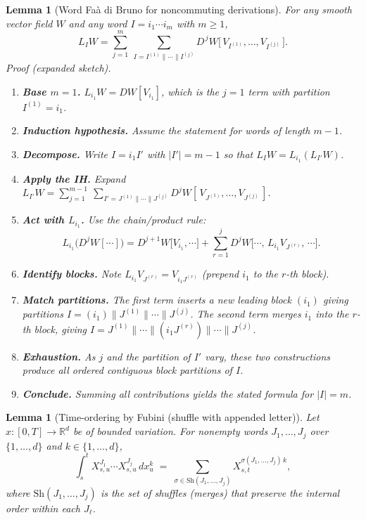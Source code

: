 \documentclass[12pt]{article}
\newtheorem{lemma}[theorem]{Lemma}
\theoremstyle{remark}
\begin{document}
\begin{lemma}[Word Fa\`a di Bruno for noncommuting derivations]\label{lem:word-FDB}
For any smooth vector field $W$ and any word $I=i_1\cdots i_m$ with $m\ge1$,
\[
\boxed{\;
L_I W
=\sum_{j=1}^{m}\ \sum_{I=I^{(1)}\|\cdots\| I^{(j)}}
D^{\,j}W\big[\,V_{I^{(1)}},\dots,V_{I^{(j)}}\,\big].
\;}
\]
\emph{Proof (expanded sketch).}
\begin{enumerate}[leftmargin=*, itemsep=0.25em]
\item \textbf{Base $m=1$.} $L_{i_1}W=DW[V_{i_1}]$, which is the $j=1$ term with partition $I^{(1)}=i_1$.
\item \textbf{Induction hypothesis.} Assume the statement for words of length $m-1$.
\item \textbf{Decompose.} Write $I=i_1 I'$ with $|I'|=m-1$ so that $L_I W=L_{i_1}(L_{I'}W)$.
\item \textbf{Apply the IH.} Expand $L_{I'}W=\sum_{j=1}^{m-1}\ \sum_{I'=J^{(1)}\|\cdots\|J^{(j)}} D^{j}W[\,V_{J^{(1)}},\dots,V_{J^{(j)}}\,]$.
\item \textbf{Act with $L_{i_1}$.} Use the chain/product rule:
\[
L_{i_1}\!\Big(D^{j}W[\cdots]\Big)
= D^{j+1}W\big[V_{i_1},\cdots\big] + \sum_{r=1}^j D^{j}W\big[\cdots,\,L_{i_1}V_{J^{(r)}},\,\cdots\big].
\]
\item \textbf{Identify blocks.} Note $L_{i_1}V_{J^{(r)}}=V_{i_1 J^{(r)}}$ (prepend $i_1$ to the $r$-th block).
\item \textbf{Match partitions.} The first term inserts a new leading block $(i_1)$ giving partitions $I=(i_1)\|J^{(1)}\|\cdots\|J^{(j)}$.
The second term merges $i_1$ into the $r$-th block, giving $I=J^{(1)}\|\cdots\|(i_1J^{(r)})\|\cdots\|J^{(j)}$.
\item \textbf{Exhaustion.} As $j$ and the partition of $I'$ vary, these two constructions produce \emph{all} ordered contiguous block partitions of $I$.
\item \textbf{Conclude.} Summing all contributions yields the stated formula for $|I|=m$.
\end{enumerate}
\end{lemma}

\begin{lemma}[Time-ordering by Fubini (shuffle with appended letter)]\label{lem:fubini-append}
Let $x:[0,T]\to\mathbb{R}^d$ be of bounded variation. For nonempty words $J_1,\ldots,J_j$ over $\{1,\ldots,d\}$ and $k\in\{1,\ldots,d\}$,
\[
\int_s^t X^{J_1}_{s,u}\cdots X^{J_j}_{s,u}\,dx^k_u
\;=\;
\sum_{\sigma\in\mathrm{Sh}(J_1,\ldots,J_j)}
X^{\sigma(J_1,\ldots,J_j)\,k}_{s,t},
\]
where $\mathrm{Sh}(J_1,\ldots,J_j)$ is the set of \emph{shuffles} (merges) that preserve the internal order within each $J_\ell$.
\end{lemma}
\end{document}
